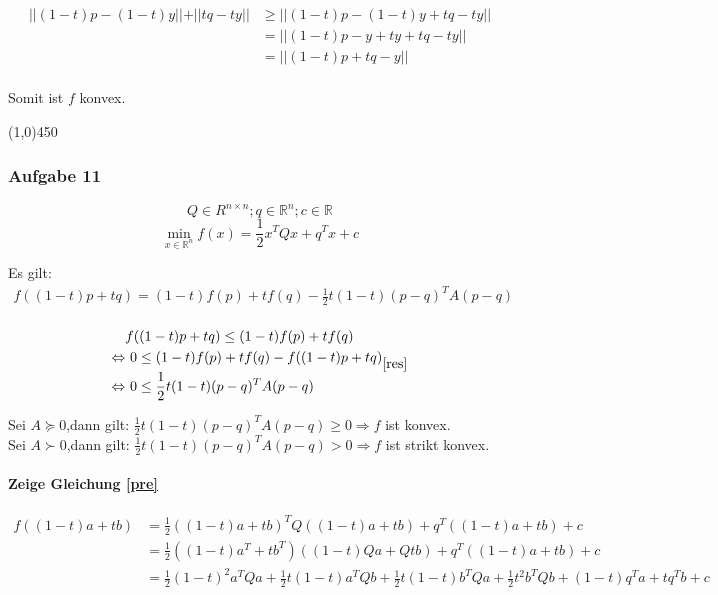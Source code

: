 \documentclass{article}
\newcommand{\hr}{\begin{center} \line(1,0){450} \end{center}}
\begin{document}
\begin{equation*}
\begin{split}
\vert \vert  (1-t)p - (1-t)y\vert \vert + \vert \vert tq -ty\vert \vert &\geq \vert \vert (1-t)p - (1-t)y +tq -ty \vert \vert \\
&= \vert \vert (1-t)p - y +ty +tq -ty\vert \vert \\
&= \vert \vert (1-t)p + tq - y\vert \vert\\
\end{split}
\end{equation*}


Somit ist $f$ konvex.


\hr
\subsubsection*{Aufgabe 11}
$$Q  \in R^{n\times n};q \in \mathbb{R}^n; c \in \mathbb{R}$$
$$\min\limits_{x \in \mathbb{R}^n} f(x) = \frac{1}{2} x^TQx+q^Tx+c$$


Es gilt:
\begin{equation}
\begin{split}
f((1-t)p + tq) = (1-t)f(p)+tf(q) -\frac{1}{2}t(1-t)(p-q)^TA(p-q)\\ 
\end{split}\label{pre}
\end{equation}



\begin{equation}
\begin{split}
&f((1-t)p+tq) \leq (1-t)f(p)+ tf(q)\\
\Leftrightarrow&~ 0 \leq (1-t)f(p)+ tf(q) - f((1-t)p+tq)\\
\Leftrightarrow&~ 0 \leq \frac{1}{2}t(1-t)(p-q)^TA(p-q)
\end{split}\ref{res}
\end{equation}


Sei $A \succeq 0$,dann gilt: $\frac{1}{2}t(1-t)(p-q)^TA(p-q) \geq 0 \Rightarrow f$ ist konvex.\\ 
Sei $A \succ 0$,dann gilt: $\frac{1}{2}t(1-t)(p-q)^TA(p-q) > 0 \Rightarrow f$ ist strikt konvex.


\paragraph{Zeige Gleichung \ref{pre}}


\begin{equation}
\begin{split}
f((1-t)a+tb) &= \frac{1}{2}((1-t)a+tb)^T Q ((1-t)a+tb)+ q^T((1-t)a+tb) + c \\
&= \frac{1}{2}((1-t)a^T + tb^T) ((1-t)Qa + Qtb) + q^T((1-t)a+tb) + c\\
&= \frac{1}{2}(1-t)^2 a^TQa + \frac{1}{2}t(1-t)a^TQb + \frac{1}{2}t(1-t)b^TQa + \frac{1}{2}t^2b^TQb + (1-t)q^Ta+t q^Tb +c%
\end{split}
\end{equation}
\end{document}
